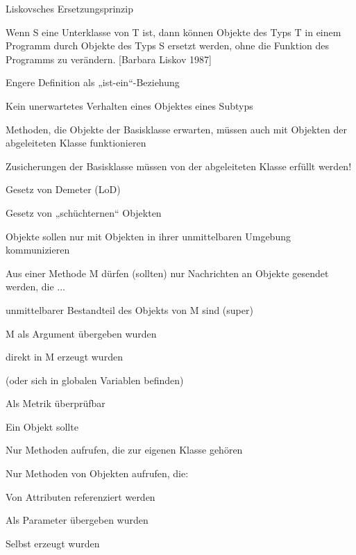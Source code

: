 \documentclass[a4paper]{article}
\begin{document}
\begin{multicols}{3}
  Liskovsches Ersetzungsprinzip
  \begin{itemize*}
    \item Wenn S eine Unterklasse von T ist, dann können Objekte des Typs T in einem Programm durch Objekte des Typs S ersetzt werden, ohne die Funktion des Programms zu verändern. [Barbara Liskov 1987]
    \item Engere Definition als „ist-ein“-Beziehung
    \item Kein unerwartetes Verhalten eines Objektes eines Subtyps
    \item Methoden, die Objekte der Basisklasse erwarten, müssen auch mit Objekten der abgeleiteten Klasse funktionieren
    \item Zusicherungen der Basisklasse müssen von der abgeleiteten Klasse erfüllt werden!
  \end{itemize*}

  Gesetz von Demeter (LoD)
  \begin{itemize*}
    \item Gesetz von „schüchternen“ Objekten
    \item Objekte sollen nur mit Objekten in ihrer unmittelbaren Umgebung kommunizieren
    \item Aus einer Methode M dürfen (sollten) nur Nachrichten an Objekte gesendet werden, die ...
          \begin{itemize*}
            \item unmittelbarer Bestandteil des Objekts von M sind (super)
            \item M als Argument übergeben wurden
            \item direkt in M erzeugt wurden
            \item (oder sich in globalen Variablen befinden)
          \end{itemize*}
    \item Als Metrik überprüfbar
  \end{itemize*}

  Ein Objekt sollte
  \begin{itemize*}
    \item Nur Methoden aufrufen, die zur eigenen Klasse gehören
    \item Nur Methoden von Objekten aufrufen, die:
          \begin{itemize*}
            \item Von Attributen referenziert werden
            \item Als Parameter übergeben wurden
            \item Selbst erzeugt wurden
          \end{itemize*}
  \end{itemize*}



\end{multicols}
\end{document}
